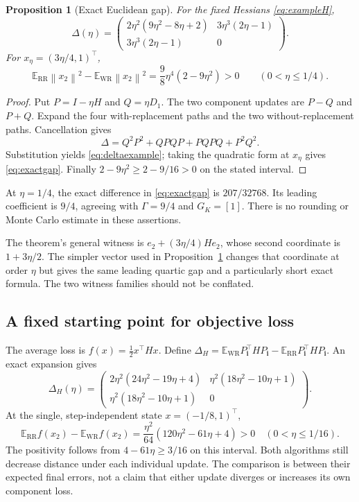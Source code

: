 \documentclass[11pt,letterpaper]{article}
\numberwithin{equation}{section}
\newtheorem{proposition}[theorem]{Proposition}
\theoremstyle{definition}
\newcommand{\E}{\mathbb E}
\newcommand{\WR}{\mathrm{WR}}
\newcommand{\RR}{\mathrm{RR}}
\newcommand{\norm}[1]{\left\lVert #1\right\rVert}
\begin{document}
\begin{proposition}[Exact Euclidean gap]\label{prop:example}
For the fixed Hessians \eqref{eq:exampleH},
\begin{equation}\label{eq:deltaexample}
 \Delta(\eta)=
 \begin{pmatrix}
 2\eta^2(9\eta^2-8\eta+2)&3\eta^3(2\eta-1)\\
 3\eta^3(2\eta-1)&0
 \end{pmatrix}.
\end{equation}
For $x_\eta=(3\eta/4,1)^\top$,
\begin{equation}\label{eq:exactgap}
 \E_{\RR}\norm{x_2}^2-\E_{\WR}\norm{x_2}^2
 =\frac98\eta^4(2-9\eta^2)>0
 \qquad(0<\eta\le1/4).
\end{equation}
\end{proposition}
\begin{proof}
Put $P=I-\eta H$ and $Q=\eta D_1$. The two component updates are $P-Q$ and $P+Q$. Expand the four with-replacement paths and the two without-replacement paths. Cancellation gives
\[
 \Delta=Q^2P^2+QPQP+PQPQ+P^2Q^2.
\]
Substitution yields \eqref{eq:deltaexample}; taking the quadratic form at $x_\eta$ gives \eqref{eq:exactgap}. Finally $2-9\eta^2\ge2-9/16>0$ on the stated interval.
\end{proof}

At $\eta=1/4$, the exact difference in \eqref{eq:exactgap} is $207/32768$. Its leading coefficient is $9/4$, agreeing with $\Gamma=9/4$ and $G_K=[1]$. There is no rounding or Monte Carlo estimate in these assertions.

The theorem's general witness is $e_2+(3\eta/4)He_2$, whose second coordinate is $1+3\eta/2$. The simpler vector used in Proposition~\ref{prop:example} changes that coordinate at order $\eta$ but gives the same leading quartic gap and a particularly short exact formula. The two witness families should not be conflated.

\subsection{A fixed starting point for objective loss}

The average loss is $f(x)=\tfrac12x^\top Hx$. Define
$\Delta_H=\E_{\WR}P_{\bm i}^\top HP_{\bm i}-\E_{\RR}P_{\bm i}^\top HP_{\bm i}$.
An exact expansion gives
\begin{equation}\label{eq:metricexample}
 \Delta_H(\eta)=
 \begin{pmatrix}
 2\eta^2(24\eta^2-19\eta+4)&\eta^2(18\eta^2-10\eta+1)\\
 \eta^2(18\eta^2-10\eta+1)&0
 \end{pmatrix}.
\end{equation}
At the single, step-independent state $x=(-1/8,1)^\top$,
\begin{equation}\label{eq:lossgap}
 \E_{\RR}f(x_2)-\E_{\WR}f(x_2)
 =\frac{\eta^2}{64}(120\eta^2-61\eta+4)>0
 \quad(0<\eta\le1/16).
\end{equation}
The positivity follows from $4-61\eta\ge3/16$ on this interval. Both algorithms still decrease distance under each individual update. The comparison is between their expected final errors, not a claim that either update diverges or increases its own component loss.
\end{document}
